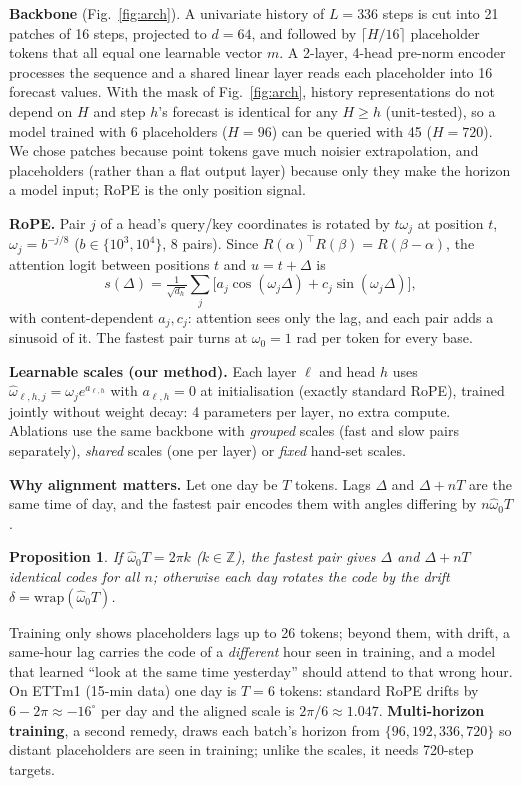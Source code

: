 \documentclass[12pt]{article}
\newtheorem{proposition}{Proposition}
\begin{document}
\textbf{Backbone} (Fig.~\ref{fig:arch}). A univariate history of $L{=}336$ steps is cut into 21 patches of 16 steps, projected to $d{=}64$, and followed by $\lceil H/16\rceil$ placeholder tokens that all equal one learnable vector $m$.
A 2-layer, 4-head pre-norm encoder processes the sequence and a shared linear layer reads each placeholder into 16 forecast values.
With the mask of Fig.~\ref{fig:arch}, history representations do not depend on $H$ and step $h$'s forecast is identical for any $H\ge h$ (unit-tested), so a model trained with 6 placeholders ($H{=}96$) can be queried with 45 ($H{=}720$).
We chose patches because point tokens gave much noisier extrapolation, and placeholders (rather than a flat output layer) because only they make the horizon a model input; RoPE is the only position signal.

\textbf{RoPE.} Pair $j$ of a head's query/key coordinates is rotated by $t\omega_j$ at position $t$, $\omega_j=b^{-j/8}$ ($b\in\{10^3,10^4\}$, 8 pairs).
Since $R(\alpha)^\top R(\beta)=R(\beta-\alpha)$, the attention logit between positions $t$ and $u=t+\Delta$ is
\begin{equation}
s(\Delta)=\tfrac{1}{\sqrt{d_h}}\textstyle\sum_{j}\big[a_j\cos(\omega_j\Delta)+c_j\sin(\omega_j\Delta)\big],
\end{equation}
with content-dependent $a_j,c_j$: attention sees only the lag, and each pair adds a sinusoid of it. The fastest pair turns at $\omega_0{=}1$ rad per token for every base.

\textbf{Learnable scales (our method).} Each layer $\ell$ and head $h$ uses $\hat\omega_{\ell,h,j}=\omega_j e^{a_{\ell,h}}$ with $a_{\ell,h}{=}0$ at initialisation (exactly standard RoPE), trained jointly without weight decay: 4 parameters per layer, no extra compute.
Ablations use the same backbone with \emph{grouped} scales (fast and slow pairs separately), \emph{shared} scales (one per layer) or \emph{fixed} hand-set scales.

\textbf{Why alignment matters.} Let one day be $T$ tokens. Lags $\Delta$ and $\Delta+nT$ are the same time of day, and the fastest pair encodes them with angles differing by $n\hat\omega_0T$.
\begin{proposition}
If $\hat\omega_0T=2\pi k$ ($k\in\mathbb{Z}$), the fastest pair gives $\Delta$ and $\Delta{+}nT$ identical codes for all $n$; otherwise each day rotates the code by the drift $\delta=\mathrm{wrap}(\hat\omega_0T)$.
\end{proposition}
Training only shows placeholders lags up to 26 tokens; beyond them, with drift, a same-hour lag carries the code of a \emph{different} hour seen in training, and a model that learned ``look at the same time yesterday'' should attend to that wrong hour.
On ETTm1 (15-min data) one day is $T{=}6$ tokens: standard RoPE drifts by $6-2\pi\approx-16^\circ$ per day and the aligned scale is $2\pi/6\approx1.047$.
\textbf{Multi-horizon training}, a second remedy, draws each batch's horizon from $\{96,192,336,720\}$ so distant placeholders are seen in training; unlike the scales, it needs 720-step targets.
\end{document}
